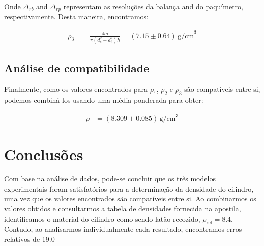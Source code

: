 \documentclass{article}
\begin{document}
\begin{multicols}{2}
Onde $\Delta_{rb}$ and $\Delta_{rp}$ representam as resoluções da balança and do paquímetro, respectivamente. Desta maneira, encontramos:

\begin{align}
\rho_3 &= \frac{4m}{\pi (d^2_e - d^2_i)h} = (7.15 \pm 0.64) \, \text{g/cm}^3
\end{align}

\subsection{Análise de compatibilidade}

Finalmente, como os valores encontrados para $\rho_1$, $\rho_2$ e $\rho_3$ são compatíveis entre si, podemos combiná-los usando uma média ponderada para obter:

\begin{align}
\rho &= (8.309 \pm 0.085) \, \text{g/cm}^3
\end{align}

\section{Conclusões}
Com base na análise de dados, pode-se concluir que os três modelos experimentais foram satisfatórios para a determinação da densidade do cilindro, uma vez que os valores encontrados são compatíveis entre si. Ao combinarmos os valores obtidos e consultarmos a tabela de densidades fornecida na apostila, identificamos o material do cilindro como sendo latão recozido, $\rho_{\text{ref}} = 8.4$. Contudo, ao analisarmos individualmente cada resultado, encontramos erros relativos de 19.0%

\end{multicols}
\end{document}

